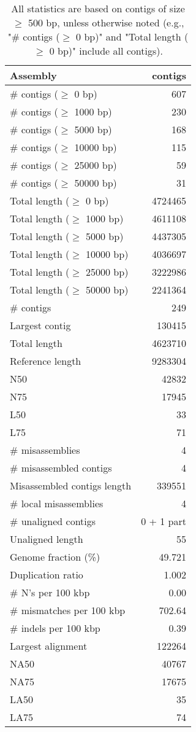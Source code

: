 \documentclass[12pt,a4paper]{article}
\begin{document}
\begin{table}[ht]
\begin{center}
\caption{All statistics are based on contigs of size $\geq$ 500 bp, unless otherwise noted (e.g., "\# contigs ($\geq$ 0 bp)" and "Total length ($\geq$ 0 bp)" include all contigs).}
\begin{tabular}{|l*{1}{|r}|}
\hline
Assembly & contigs \\ \hline
\# contigs ($\geq$ 0 bp) & 607 \\ \hline
\# contigs ($\geq$ 1000 bp) & 230 \\ \hline
\# contigs ($\geq$ 5000 bp) & 168 \\ \hline
\# contigs ($\geq$ 10000 bp) & 115 \\ \hline
\# contigs ($\geq$ 25000 bp) & 59 \\ \hline
\# contigs ($\geq$ 50000 bp) & 31 \\ \hline
Total length ($\geq$ 0 bp) & 4724465 \\ \hline
Total length ($\geq$ 1000 bp) & 4611108 \\ \hline
Total length ($\geq$ 5000 bp) & 4437305 \\ \hline
Total length ($\geq$ 10000 bp) & 4036697 \\ \hline
Total length ($\geq$ 25000 bp) & 3222986 \\ \hline
Total length ($\geq$ 50000 bp) & 2241364 \\ \hline
\# contigs & 249 \\ \hline
Largest contig & 130415 \\ \hline
Total length & 4623710 \\ \hline
Reference length & 9283304 \\ \hline
N50 & 42832 \\ \hline
N75 & 17945 \\ \hline
L50 & 33 \\ \hline
L75 & 71 \\ \hline
\# misassemblies & 4 \\ \hline
\# misassembled contigs & 4 \\ \hline
Misassembled contigs length & 339551 \\ \hline
\# local misassemblies & 4 \\ \hline
\# unaligned contigs & 0 + 1 part \\ \hline
Unaligned length & 55 \\ \hline
Genome fraction (\%) & 49.721 \\ \hline
Duplication ratio & 1.002 \\ \hline
\# N's per 100 kbp & 0.00 \\ \hline
\# mismatches per 100 kbp & 702.64 \\ \hline
\# indels per 100 kbp & 0.39 \\ \hline
Largest alignment & 122264 \\ \hline
NA50 & 40767 \\ \hline
NA75 & 17675 \\ \hline
LA50 & 35 \\ \hline
LA75 & 74 \\ \hline
\end{tabular}
\end{center}
\end{table}
\end{document}

